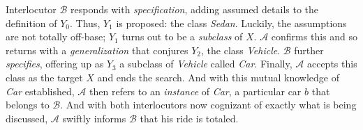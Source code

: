 Interlocutor $\mathcal{B}$ responds with \textit{specification}, adding assumed details to the definition of $Y_0$. Thus, $Y_1$ is proposed: the class \textit{Sedan}. Luckily, the assumptions are not totally off-base; $Y_1$ turns out to be a \textit{subclass} of $X$. $\mathcal{A}$ confirms this and so returns with a \textit{generalization} that conjures $Y_2$, the class \textit{Vehicle}. $\mathcal{B}$ further \textit{specifies}, offering up as $Y_3$ a subclass of \textit{Vehicle} called \textit{Car}. Finally, $\mathcal{A}$ accepts this class as the target $X$ and ends the search. And with this mutual knowledge of \textit{Car} established, $\mathcal{A}$ then refers to an \textit{instance} of \textit{Car}, a particular car $b$ that belongs to $\mathcal{B}$. And with both interlocutors now cognizant of exactly what is being discussed, $\mathcal{A}$ swiftly informs $\mathcal{B}$ that his ride is totaled.


